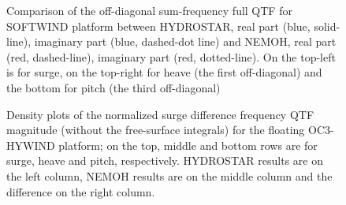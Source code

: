 \documentclass[12pt,a4paper,titlepage]{article}
\begin{document}
\begin{figure}[ht!]
{}
	\caption{Comparison of the off-diagonal sum-frequency full QTF for SOFTWIND platform between HYDROSTAR, real part (blue, solid-line), imaginary part (blue, dashed-dot line) and NEMOH, real part (red, dashed-line), imaginary part (red, dotted-line). On the top-left is for surge, on the top-right for heave (the first off-diagonal) and the bottom for pitch (the third off-diagonal)}\label{fig:QTFP_SOFTWIND_DIAG}
\end{figure}

\begin{figure}[ht!]
	\centering
{}
	\caption{Density plots of the normalized surge difference frequency QTF magnitude (without the free-surface integrals) for the floating OC3-HYWIND platform; on the top, middle and bottom rows are for surge, heave and pitch, respectively. HYDROSTAR results are on the left column, NEMOH results are on the middle column and the difference on the right column.}\label{fig:QTFM_OC3_HYWIND}
\end{figure}
\end{document}
